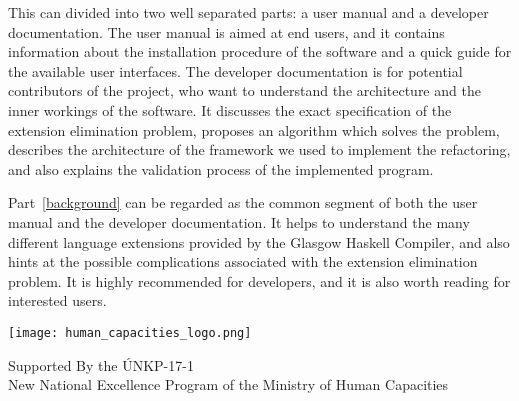 \documentclass[main.tex]{subfiles}
\begin{document}
	This \paper{} can divided into two well separated parts: a user manual and a developer documentation. The user manual is aimed at end users, and it contains information about the installation procedure of the software and a quick guide for the available user interfaces. The developer documentation is for potential contributors of the project, who want to understand the architecture and the inner workings of the software. It discusses the exact specification of the extension elimination problem, proposes an algorithm which solves the problem, describes the architecture of the framework we used to implement the refactoring, and also explains the validation process of the implemented program.
	
	Part~\ref{background} can be regarded as the common segment of both the user manual and the developer documentation. It helps to understand the many different language extensions provided by the Glasgow Haskell Compiler, and also hints at the possible complications associated with the extension elimination problem. It is highly recommended for developers, and it is also worth reading for interested users.
	
	\vfill
	
	\begin{center}
		\texttt{[image: human\_capacities\_logo.png]}
	\end{center}
	
	\hspace{3cm}
	
	\begin{center}
		Supported By the ÚNKP-17-1 \\
		New National Excellence Program of the Ministry of Human Capacities
	\end{center}
	
\end{document}
